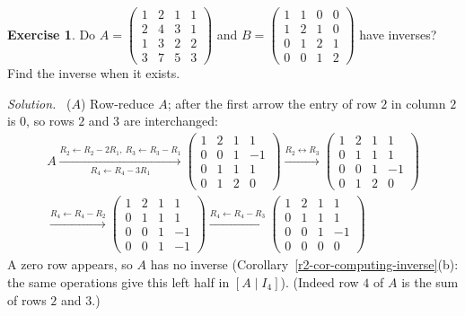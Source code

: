 \documentclass[12pt]{article}
\theoremstyle{definition}
\newtheorem{exercise}{Exercise}
\newenvironment{solution}{\par\noindent\textit{Solution.}\ }{\par\smallskip}
\begin{document}
\begin{exercise}\label{r2-ex-two-inverses}
Do \(A=\begin{pmatrix}1&2&1&1\\2&4&3&1\\1&3&2&2\\3&7&5&3\end{pmatrix}\) and
\(B=\begin{pmatrix}1&1&0&0\\1&2&1&0\\0&1&2&1\\0&0&1&2\end{pmatrix}\) have inverses? Find the
inverse when it exists.
\end{exercise}
\begin{solution}
(\(A\)) Row-reduce \(A\); after the first arrow the entry of row \(2\) in column \(2\) is \(0\),
so rows \(2\) and \(3\) are interchanged:
\[
\begin{gathered}
A\xrightarrow[R_4\leftarrow R_4-3R_1]{R_2\leftarrow R_2-2R_1,\ R_3\leftarrow R_3-R_1}
\begin{pmatrix}1&2&1&1\\0&0&1&-1\\0&1&1&1\\0&1&2&0\end{pmatrix}
\xrightarrow{R_2\leftrightarrow R_3}
\begin{pmatrix}1&2&1&1\\0&1&1&1\\0&0&1&-1\\0&1&2&0\end{pmatrix}
\\
\xrightarrow{R_4\leftarrow R_4-R_2}
\begin{pmatrix}1&2&1&1\\0&1&1&1\\0&0&1&-1\\0&0&1&-1\end{pmatrix}
\xrightarrow{R_4\leftarrow R_4-R_3}
\begin{pmatrix}1&2&1&1\\0&1&1&1\\0&0&1&-1\\0&0&0&0\end{pmatrix}
\end{gathered}
\]
A zero row appears, so \(A\) has no inverse (Corollary~\ref{r2-cor-computing-inverse}(b): the same operations
give this left half in \([A\mid I_4]\)). (Indeed row \(4\) of \(A\) is the sum of rows \(2\) and \(3\).)


\end{solution}
\end{document}

